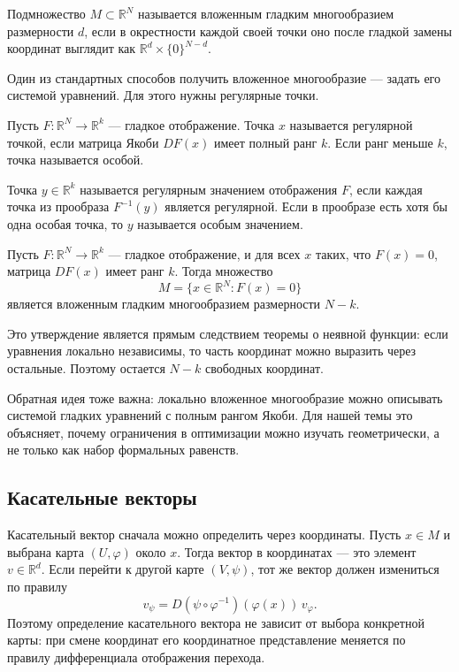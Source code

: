 \documentclass[a4paper,12pt]{article}
\newcommand{\R}{\mathbb{R}}
\begin{document}
\begin{definition}
    Подмножество $M\subset\R^N$ называется вложенным гладким многообразием размерности $d$, если в окрестности каждой своей точки оно после гладкой замены координат выглядит как $\R^d\times\{0\}^{N-d}$.
\end{definition}

Один из стандартных способов получить вложенное многообразие --- задать его системой уравнений. Для этого нужны регулярные точки.

\begin{definition}
    Пусть $F:\R^N\to\R^k$ --- гладкое отображение. Точка $x$ называется регулярной точкой, если матрица Якоби $DF(x)$ имеет полный ранг $k$. Если ранг меньше $k$, точка называется особой.
\end{definition}

\begin{definition}
    Точка $y\in\R^k$ называется регулярным значением отображения $F$, если каждая точка из прообраза $F^{-1}(y)$ является регулярной. Если в прообразе есть хотя бы одна особая точка, то $y$ называется особым значением.
\end{definition}

\begin{theorem}
    Пусть $F:\R^N\to\R^k$ --- гладкое отображение, и для всех $x$ таких, что $F(x)=0$, матрица $DF(x)$ имеет ранг $k$. Тогда множество
    \[
        M=\{x\in\R^N:F(x)=0\}
    \]
    является вложенным гладким многообразием размерности $N-k$.
\end{theorem}

Это утверждение является прямым следствием теоремы о неявной функции: если уравнения локально независимы, то часть координат можно выразить через остальные. Поэтому остается $N-k$ свободных координат.

Обратная идея тоже важна: локально вложенное многообразие можно описывать системой гладких уравнений с полным рангом Якоби. Для нашей темы это объясняет, почему ограничения в оптимизации можно изучать геометрически, а не только как набор формальных равенств.

\subsection{Касательные векторы}

Касательный вектор сначала можно определить через координаты. Пусть $x\in M$ и выбрана карта $(U,\varphi)$ около $x$. Тогда вектор в координатах --- это элемент $v\in\R^d$. Если перейти к другой карте $(V,\psi)$, тот же вектор должен измениться по правилу
\[
    v_\psi =
    D(\psi\circ\varphi^{-1})(\varphi(x))\,v_\varphi.
\]
Поэтому определение касательного вектора не зависит от выбора конкретной карты: при смене координат его координатное представление меняется по правилу дифференциала отображения перехода.
\end{document}
